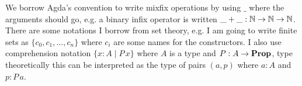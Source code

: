 We borrow Agda's convention to write mixfix operations by using $\_$ where the arguments should go, e.g. a binary infix operator is written $\_+\_ : \mathbb{N} \to \mathbb{N} \to \mathbb{N}$. There are some notations I borrow from set theory, e.g. I am going to write finite sets as $\{c_0,c_1, \dots, c_n \}$ where $c_i$ are some names for the constructors. I also use comprehension notation $\{ x : A \mid P\,x \}$ where $A$ is a type and $P :A \to \mathbf{Prop}$, type theoretically this can be interpreted as the type of pairs $(a,p)$ where $a:A$ and $p : P\,a$.%

